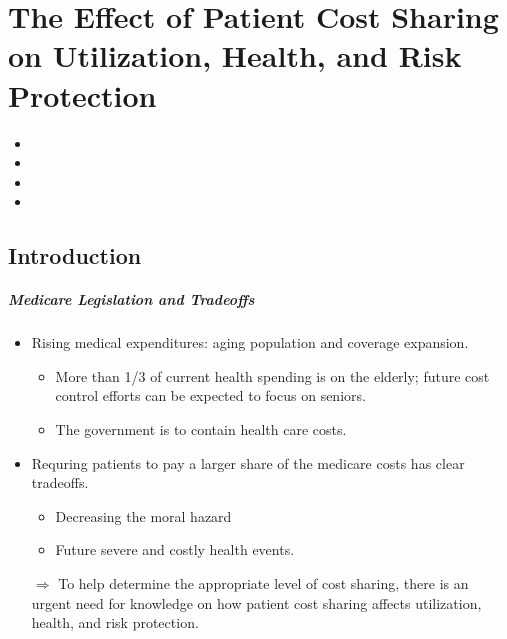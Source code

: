 \documentclass[../root]{subfiles}
\begin{document}
    \chapter{The Effect of Patient Cost Sharing on Utilization, Health, and Risk Protection}

    \begin{shortsummary}
        \begin{itemize}
            \item {}
            \item {}
            \item {}
            \item {}
        \end{itemize}
    \end{shortsummary}

    \section{Introduction}

    \paragraph{Medicare Legislation and Tradeoffs}

    \begin{itemize}
      \item Rising medical expenditures: aging population and coverage expansion.
      \begin{itemize}
        \item More than 1/3 of current health spending is on the elderly; future cost control efforts can be expected to focus on seniors.
        \item The government is to contain health care costs.
      \end{itemize}
      \item Requring patients to pay a larger share of the medicare costs has clear tradeoffs.
      \begin{itemize}
        \item Decreasing the moral hazard
        \item Future severe and costly health events.
      \end{itemize}
      $\Rightarrow$ To help determine the appropriate level of cost sharing, there is an urgent need for knowledge on how patient cost sharing affects utilization, health, and risk protection.
    \end{itemize}
\end{document}
